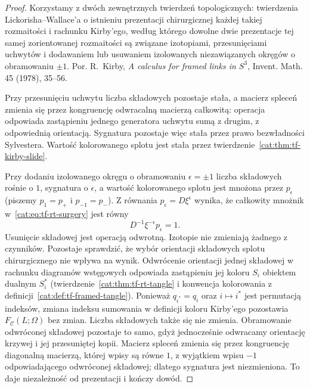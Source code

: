 \begin{proof}
Korzystamy z dwóch zewnętrznych twierdzeń topologicznych: twierdzenia Lickorisha--Wallace'a o istnieniu prezentacji chirurgicznej każdej takiej rozmaitości i rachunku Kirby'ego, według którego dowolne dwie prezentacje tej samej zorientowanej rozmaitości są związane izotopiami, przesunięciami uchwytów i dodawaniem lub usuwaniem izolowanych niezawiązanych okręgów o obramowaniu $\pm1$. Por. R.~Kirby, \emph{A calculus for framed links in $S^3$}, Invent. Math. 45 (1978), 35--56.

Przy przesunięciu uchwytu liczba składowych pozostaje stała, a macierz spleceń zmienia się przez kongruencję odwracalną macierzą całkowitą: operacja odpowiada zastąpieniu jednego generatora uchwytu sumą z drugim, z odpowiednią orientacją. Sygnatura pozostaje więc stała przez prawo bezwładności Sylvestera. Wartość kolorowanego splotu jest stała przez twierdzenie~\ref{cat:thm:tf-kirby-slide}.

Przy dodaniu izolowanego okręgu o obramowaniu $\epsilon=\pm1$ liczba składowych rośnie o $1$, sygnatura o $\epsilon$, a wartość kolorowanego splotu jest mnożona przez $p_\epsilon$ (piszemy $p_1=p_+$ i $p_{-1}=p_-$). Z równania $p_\epsilon=D\xi^\epsilon$ wynika, że całkowity mnożnik w~\eqref{cat:eq:tf-rt-surgery} jest równy
\[
 D^{-1}\xi^{-\epsilon}p_\epsilon=1.
\]
Usunięcie składowej jest operacją odwrotną. Izotopie nie zmieniają żadnego z czynników. Pozostaje sprawdzić, że wybór orientacji składowych splotu chirurgicznego nie wpływa na wynik. Odwrócenie orientacji jednej składowej w rachunku diagramów wstęgowych odpowiada zastąpieniu jej koloru $S_i$ obiektem dualnym $S_i^*$ (twierdzenie~\ref{cat:thm:tf-rt-tangle} i konwencja kolorowania z definicji~\ref{cat:def:tf-framed-tangle}). Ponieważ $q_{i^*}=q_i$ oraz $i\mapsto i^*$ jest permutacją indeksów, zmiana indeksu sumowania w definicji koloru Kirby'ego pozostawia $F_{\mathcal C}(L;\Omega)$ bez zmian. Liczba składowych także się nie zmienia. Obramowanie odwróconej składowej pozostaje to samo, gdyż jednocześnie odwracamy orientację krzywej i jej przesuniętej kopii. Macierz spleceń zmienia się przez kongruencję diagonalną macierzą, której wpisy są równe $1$, z wyjątkiem wpisu $-1$ odpowiadającego odwróconej składowej; dlatego sygnatura jest niezmieniona. To daje niezależność od prezentacji i kończy dowód.
\end{proof}

